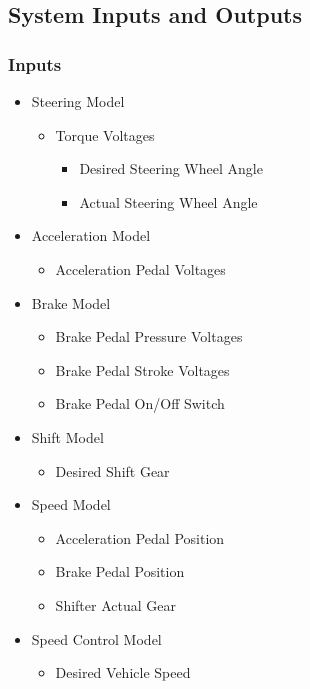 \documentclass[12pt]{article} %
\begin{document}
\subsection{System Inputs and Outputs}
\subsubsection{Inputs}

\begin{itemize}
    \item Steering Model
    \begin{itemize}
    		\item Torque Voltages
    		\begin{itemize}
    			\item Desired Steering Wheel Angle
    			\item Actual Steering Wheel Angle
    		\end{itemize}
    \end{itemize}
    \item Acceleration Model
    \begin{itemize}
    		\item Acceleration Pedal Voltages
    \end{itemize}
    \item Brake Model
    \begin{itemize}
    		\item Brake Pedal Pressure Voltages
    		\item Brake Pedal Stroke Voltages 
    		\item Brake Pedal On/Off Switch
    \end{itemize}
    \item Shift Model
    \begin{itemize}
    		\item Desired Shift Gear
    \end{itemize}
    \item Speed Model
    \begin{itemize}
    		\item Acceleration Pedal Position
    		\item Brake Pedal Position
    		\item Shifter Actual Gear
    \end{itemize}
    \item Speed Control Model
    \begin{itemize}
    		\item Desired Vehicle Speed
    \end{itemize}
\end{itemize}
\end{document}
